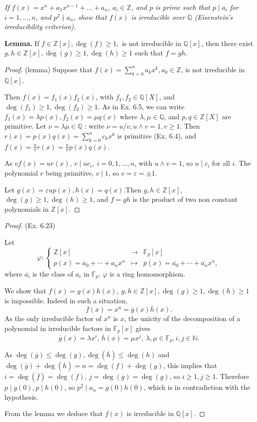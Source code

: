 \documentclass[11pt,a4paper]{article}
\newcommand{\Q}{\mathbb{Q}}
\newcommand{\Z}{\mathbb{Z}}
\newcommand{\N}{\mathbb{N}}
\newcommand{\F}{\mathbb{F}}
\begin{document}
{\it If $f(x) = x^n + a_1 x^{n-1} + \ldots + a_n$, $a_i \in \Z$, and $p$ is prime such that $p \mid a_i$ for $i = 1, \ldots, n$, and $p^2 \nmid a_n$, show that $f(x)$ is irreducible over $\Q$ (Eisenstein's irreducibility criterion).
}

\bigskip

{\bf Lemma.} If $f \in \Z[x], \deg(f) \geq 1,$ is not irreducible in $\Q[x]$, then there exist $g,h \in \Z[x] , \deg(g) \geq 1, \deg(h) \geq 1$ such that $f = gh$.
\begin{proof}(lemma)
Suppose that  $f(x)  = \sum\limits_{k=0}^n a_k x^k, a_k \in \mathbb{Z}$, is not irreducible in $\mathbb{Q}[x]$.

Then $f(x)= f_1(x)f_2(x) $, with $f_1,f_2 \in \mathbb{Q}[X]$, and $\deg(f_1)\geq 1, \deg(f_2) \geq 1$. As in Ex. 6.5, we can write $f_1(x) = \lambda p(x), f_2(x) = \mu q(x)$ where $\lambda, \mu \in \mathbb{Q}$, and $p,q \in \mathbb{Z}[X]$ are primitive. Let $\nu = \lambda \mu \in \Q$ : write $\nu = u/v, u\wedge v = 1, v \geq 1$. Then  $r(x) =  p(x)q(x) = \sum\limits_{k=0}^n c_k x^k$ is primitive (Ex. 6.4), and $f(x) = \frac{u}{v} r(x) =  \frac{u}{v} p(x)q(x)$.

As $vf(x) = ur(x)$, $v\mid uc_i,\ i=0,1,\ldots,n$, with $u \wedge v = 1$, so   $u \mid c_i$ for all $i$. The polynomial $r$ being primitive, $v \mid 1$, so $v = \varepsilon = \pm 1$.

Let $g(x) = \varepsilon u p(x), h(x)  = q(x)$.Then $g,h \in \Z[x]$,  $\deg(g)  \geq 1, \deg(h)  \geq 1$, and $f = gh$ is the product of  two non constant polynomials in  $\Z[x]$.

\end{proof}
\begin{proof}(Ex. 6.23) 

Let
$$
\varphi : 
\left\{
\begin{array}{ccc}
  \Z[x]&   \to & \F_p[x]  \\
  p(x)= a_0 +\cdots+a_n x^n& \mapsto  & \overline{p}(x) =  \overline{a_0}+\cdots+\overline{a_n}x^n,
\end{array}
\right.
$$
where $\overline{a_i}$ is the class of $a_i$ in $\F_p$.  $\varphi$ is a ring homomorphism.

We show that $f(x) = g(x) h(x),\  g,h \in \Z[x], \deg(g) \geq 1, \deg(h) \geq 1$ is impossible. Indeed in such a situation,
$$\overline{f}(x) = x^n = \overline{g}(x)\overline{h}(x).$$ 
As the only irreducible factor of $x^n$ is $x$, the unicity of the decomposition of a polynomial in irreducible factors in $\F_p[x]$ gives
$$\overline{g}(x) = \lambda x^i,\,  \overline{h}(x) = \mu x^j,\ \lambda, \mu \in \F_p, i,j \in \N.$$

As $\deg(\overline{g}) \leq \deg(g), \deg(\overline{h}) \leq \deg(h)$ and $\deg(\overline{g}) + \deg(\overline{h}) = n = \deg(f) + \deg(g)$, this implies that $i = \deg(\overline{f}) = \deg(f)$, $j=\deg(\overline{g}) = \deg(g)$, so $i\geq 1, j \geq 1$. Therefore $p \mid g(0), p \mid h(0)$, so $p^2 \mid a_n = g(0)h(0)$, which is in contradiction with the hypothesis.

From the lemma we deduce that $f(x)$ is irreducible in $\Q[x]$.
\end{proof}
\end{document}
